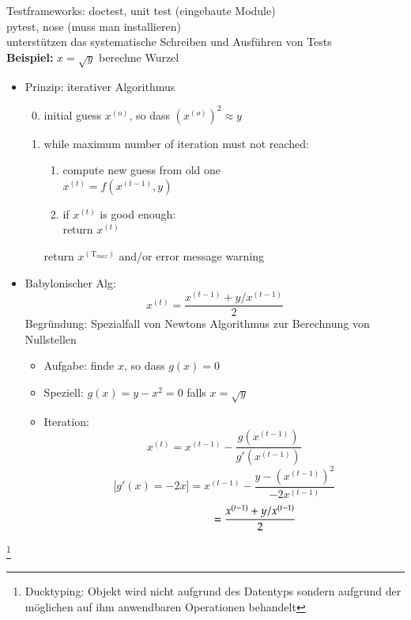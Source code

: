 \documentclass[11pt, fleqn]{scrreprt}
\begin{document}
Testframeworks: doctest, unit test (eingebaute Module) \\
\hspace*{2,85cm} pytest, nose (muss man installieren)\\
\hspace*{0,5cm} unterstützen das systematische Schreiben und Ausführen von Tests \\
\textbf{Beispiel: }$x=\sqrt{y}$ \hspace*{5mm}berechne Wurzel
\begin{itemize}
    \item Prinzip: iterativer Algorithmus
    \begin{enumerate}
        \setcounter{enumi}{-1}
        \item initial guess $x^{(o)}$, so dass $(x^{(o)})^{2} \approx y$
        \item while maximum number of iteration must not reached:
        \begin{enumerate}[label=\alph*)]
            \item compute new guess from old one \\
            $x^{(t)} = f(x^{(t-1)},y)$
            \item if $x^{(t)}$ is good enough: \\
            return $x^{(t)}$
        \end{enumerate}
        return $x^{(\text{T}_{max})}$ and/or error message warning
    \end{enumerate}
    \item Babylonischer Alg:
     \[ x^{(t)} = \frac{x^{(t-1)}+y/x^{(t-1)}}{2} \]
     Begründung: Spezialfall von Newtons Algorithmus zur Berechnung von Nullstellen
     \begin{itemize}[label={}]
        \item Aufgabe: \hspace*{5mm}finde $x$, so dass $g(x) = 0$
        \item Speziell:  \hspace*{6mm}$g(x) = y - x^2 = 0$ falls $x = \sqrt{y}$
        \item Iteration:
        \[ x^{(t)} = x^{(t-1)} - \frac{g(x^{(t-1)})}{g'(x^{(t-1)})}\]
        \[ \biggl\lbrack g'(x) = -2x \biggr\rbrack = x^{(t-1)} - \frac{y-{(x^{(t-1)})}^2}{-2x^{(t-1)}}\]
        \[ \hspace*{2cm} = \frac{x^{(t-1)} + y/x^{(t-1)}}{2}\]
     \end{itemize}
\end{itemize}
\footnote{Ducktyping: Objekt wird nicht aufgrund des Datentyps sondern aufgrund der möglichen auf ihm anwendbaren Operationen behandelt}
\end{document}
